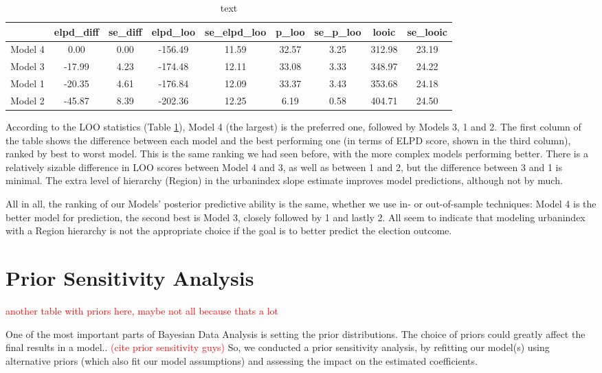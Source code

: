 \documentclass[12pt]{article}
\begin{document}
\begin{table}[ht]
	\centering
	\begin{tabular}{rcccccccc}
		\hline
		& elpd\_diff & se\_diff & elpd\_loo & se\_elpd\_loo & p\_loo & se\_p\_loo & looic & se\_looic \\ 
		\hline
		Model 4 & 0.00 & 0.00 & -156.49 & 11.59 & 32.57 & 3.25 & 312.98 & 23.19 \\ 
		Model 3 & -17.99 & 4.23 & -174.48 & 12.11 & 33.08 & 3.33 & 348.97 & 24.22 \\ 
		Model 1 & -20.35 & 4.61 & -176.84 & 12.09 & 33.37 & 3.43 & 353.68 & 24.18 \\ 
		Model 2 & -45.87 & 8.39 & -202.36 & 12.25 & 6.19 & 0.58 & 404.71 & 24.50 \\ 
		\hline
	\end{tabular}
	\caption{text}
	\label{tab:loo}
\end{table}

According to the LOO statistics (Table \ref{tab:loo}), Model 4 (the largest) is the preferred one, followed by Models 3, 1 and 2. The first column of the table shows the difference between each model and the best performing one (in terms of ELPD score, shown in the third column), ranked by best to worst model.
This is the same ranking we had seen before, with the more complex models performing better. There is a relatively sizable difference in LOO scores between Model 4 and 3, as well as between 1 and 2, but the difference between 3 and 1 is minimal. The extra level of hierarchy (Region) in the urbanindex slope estimate improves model predictions, although not by much.


All in all, the ranking of our Models' posterior predictive ability is the same, whether we use in- or out-of-sample techniques: Model 4 is the better model for prediction, the second best is Model 3, closely followed by 1 and lastly 2. All seem to indicate that modeling urbanindex with a Region hierarchy is not the appropriate choice if the goal is to better predict the election outcome.




\section{Prior Sensitivity Analysis}

\textcolor{red}{another table with priors here, maybe not all because thats a lot}

One of the most important parts of Bayesian Data Analysis is setting the prior distributions. The choice of priors could greatly affect the final results in a model..  \textcolor{red}{(cite prior sensitivity guys)}
So, we conducted a prior sensitivity analysis, by refitting our model(s) using alternative priors (which also fit our model assumptions) and assessing the impact on the estimated coefficients.
\end{document}
